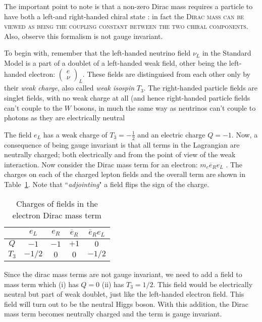 The important point to note is that a non-zero Dirac mass requires a particle to have both a left-and right-handed chiral state : in fact the \textsc{Dirac mass can be viewed as being the coupling constant
between the two chiral components}. Also, observe this formalism is not gauge invariant.

To begin with, remember that the left-handed neutrino field \(\nu _L\) in the Standard Model is a part of a doublet of a left-handed weak field, other being the left-handed electron: \(\begin{pmatrix}e \\ \nu\end{pmatrix}_L\). These fields are distinguised from each other only by their \emph{weak charge}, also called \emph{weak isospin} \(T_3\). The right-handed particle fields are singlet fields, with no weak charge at all (and hence right-handed particle fields can’t couple to the $W$ bosons, in much the same way as neutrinos can’t couple to photons as they are electrically
neutral

The field \(e_L\) has a weak charge of $T_3 = - \frac{1}{2}$ and an electric charge $Q = -1$. Now, a consequence of being gauge invariant is that all terms in the Lagrangian are neutrally charged; both electrically and from the point of view of the weak interaction. Now consider the Dirac mass term for an electron: $m_e \overline{e}_R e_L$ . The charges on each of the charged lepton fields and the overall term are shown in Table~\ref{tab:charges_sm}.
Note that ``\textit{adjointing}"  a field flips the sign of the charge.
\begin{table}[!h]
    \centering
    \begin{tabular}{|c|c|c|c|c|}\hline
    & $e_L$ & $e_R$ & $\overline {e}_R$ & $\overline {e}_R {e}_L$\\\hline
    $Q$ & $-1$ & $-1$ & $+1$ & $0$\\
    $T_3$ & $-1/2$ & $0$ & $0$ & $-1/2$  \\\hline
    \end{tabular}
    \caption{Charges of fields in the electron Dirac mass term}
    \label{tab:charges_sm}
\end{table}
Since the dirac mass terms are not gauge invariant, we need to add a field to mass term which (i) has \(Q = 0\) (ii) has \(T_3 = 1/2\). This field would be electrically neutral but part of weak doublet, just like the left-handed electron field. This field will turn out to be the neutral Higgs boson. With this addition, the Dirac mass term becomes neutrally charged and the term is gauge invariant.

